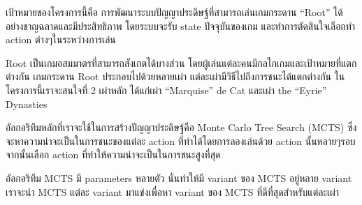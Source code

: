 \maketitle
\makesignature

\ifproject
\begin{abstractTH}
เป้าหมายของโครงการนี้คือ การพัฒนาระบบปัญญาประดิษฐ์ที่สามารถเล่นเกมกระดาน ``Root'' ได้อย่างชาญฉลาดและมีประสิทธิภาพ โดยระบบจะรับ state ปัจจุบันของเกม และทำการตัดสินใจเลือกทำ action ต่างๆในระหว่างการเล่น

Root เป็นเกมอสมมาตรที่สามารถสังเกตได้บางส่วน โดยผู้เล่นแต่ละคนมีกลไกเกมและเป้าหมายที่แตกต่างกัน เกมกระดาน Root ประกอบไปด้วยหลายเผ่า แต่ละเผ่ามีวิธีไปถึงการชนะได้แตกต่างกัน ในโครงการนี้เราจะสนใจที่ 2 เผ่าหลัก ได้แก่เผ่า ``Marquise'' de Cat และเผ่า the ``Eyrie'' Dynasties

อัลกอริทึมหลักที่เราจะใช้ในการสร้างปัญญาประดิษฐ์คือ Monte Carlo Tree Search (MCTS) ซึ่งจะหาความน่าจะเป็นในการชนะของแต่ละ action ที่ทำได้โดยการลองเล่นด้วย action นั้นหลายๆรอบ จากนั้นเลือก action ที่ทำให้ความน่าจะเป็นในการชนะสูงที่สุด

อัลกอริทึม MCTS มี parameters หลายตัว นั่นทำให้มี variant ของ MCTS อยู่หลาย variant เราจะนำ MCTS แต่ละ variant มาแข่งเพื่อหา variant ของ MCTS ที่ดีที่สุดสำหรับแต่ละเผ่า


\end{abstractTH}

